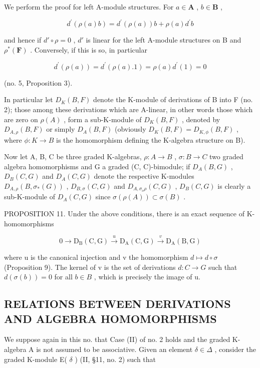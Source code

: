 We perform the proof for left A-module structures. For \(a \in \mathbf{A}\) , \(b \in \mathbf{B}\) ,

\[
d ^ {\prime} (\rho (a) b) = d ^ {\prime} (\rho (a)) b + \rho (a) d ^ {\prime} b
\]

and hence if \(d' \circ \rho = 0\) , \(d'\) is linear for the left A-module structures on B and \(\rho^*(\mathbf{F})\) . Conversely, if this is so, in particular

\[
d ^ {\prime} (\rho (a)) = d ^ {\prime} (\rho (a). 1) = \rho (a) d ^ {\prime} (1) = 0
\]

(no. 5, Proposition 3).

In particular let \(D_{K}(B,F)\) denote the K-module of derivations of B into F (no. 2); those among these derivations which are A-linear, in other words those which are zero on \(\rho(A)\) , form a sub-K-module of \(D_{K}(B,F)\) , denoted by \(D_{A,\rho}(B,F)\) or simply \(D_{A}(B,F)\) (obviously \(D_{K}(B,F)=D_{K,\phi}(B,F)\) , where \(\phi:K\to B\) is the homomorphism defining the K-algebra structure on B).

Now let A, B, C be three graded K-algebras, \(\rho:A\to B\) , \(\sigma:B\to C\) two graded algebra homomorphisms and G a graded (C, C)-bimodule; if \(D_{A}(B,G)\) , \(D_{B}(C,G)\) and \(D_{A}(C,G)\) denote the respective K-modules \(D_{A,\rho}(B,\sigma_{*}(G))\) , \(D_{B,\sigma}(C,G)\) and \(D_{A,\sigma_{o}\rho}(C,G)\) , \(D_{B}(C,G)\) is clearly a sub-K-module of \(D_{A}(C,G)\) since \(\sigma(\rho(A))\subset\sigma(B)\) .

PROPOSITION 11. Under the above conditions, there is an exact sequence of K-homomorphisms

\[
0 \rightarrow \mathrm{D} _ {\mathrm{B}} (\mathrm{C}, \mathrm{G}) \xrightarrow {u} \mathrm{D} _ {\mathrm{A}} (\mathrm{C}, \mathrm{G}) \xrightarrow {v} \mathrm{D} _ {\mathrm{A}} (\mathrm{B}, \mathrm{G})\tag{27}
\]

where u is the canonical injection and v the homomorphism \(d \mapsto d \circ \sigma\) (Proposition 9). The kernel of v is the set of derivations \(d: C \to G\) such that \(d(\sigma(b)) = 0\) for all \(b \in B\) , which is precisely the image of u.

\subsection{RELATIONS BETWEEN DERIVATIONS AND ALGEBRA HOMOMORPHISMS}

We suppose again in this no. that Case (II) of no. 2 holds and the graded K-algebra A is not assumed to be associative. Given an element \(\delta \in \Delta\) , consider the graded K-module E( \(\delta\) ) (II, §11, no. 2) such that

